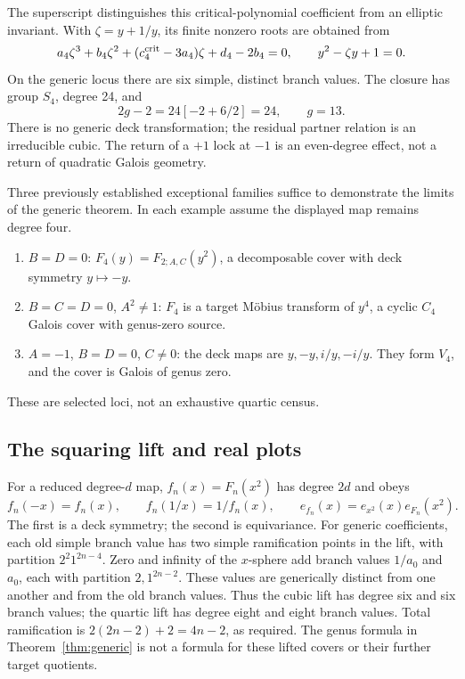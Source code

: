 The superscript distinguishes this critical-polynomial coefficient from an elliptic invariant. With \(\zeta=y+1/y\), its finite nonzero roots are obtained from
\begin{equation}\label{eq:critical_cubic4}
 a_4\zeta^3+b_4\zeta^2+(c_4^{\rm crit}-3a_4)\zeta+d_4-2b_4=0,
 \qquad y^2-\zeta y+1=0.
\end{equation}
On the generic locus there are six simple, distinct branch values. The closure has group \(S_4\), degree 24, and
\begin{equation}\label{eq:quartic_genus}
 2g-2=24[-2+6/2]=24,\qquad g=13.
\end{equation}
There is no generic deck transformation; the residual partner relation is an irreducible cubic. The return of a \(+1\) lock at \(-1\) is an even-degree effect, not a return of quadratic Galois geometry.

Three previously established exceptional families suffice to demonstrate the limits of the generic theorem. In each example assume the displayed map remains degree four.
\begin{enumerate}
\item \(B=D=0\): \(F_4(y)=F_{2;A,C}(y^2)\), a decomposable cover with deck symmetry \(y\mapsto-y\).
\item \(B=C=D=0\), \(A^2\ne1\): \(F_4\) is a target Möbius transform of \(y^4\), a cyclic \(C_4\) Galois cover with genus-zero source.
\item \(A=-1\), \(B=D=0\), \(C\ne0\): the deck maps are \(y,-y,i/y,-i/y\). They form \(V_4\), and the cover is Galois of genus zero.
\end{enumerate}
These are selected loci, not an exhaustive quartic census.

\subsection{The squaring lift and real plots}\label{sec:x_lift}
For a reduced degree-\(d\) map, \(f_n(x)=F_n(x^2)\) has degree \(2d\) and obeys
\begin{equation}\label{eq:x_lift}
 f_n(-x)=f_n(x),\qquad f_n(1/x)=1/f_n(x),\qquad
 e_{f_n}(x)=e_{x^2}(x)e_{F_n}(x^2).
\end{equation}
The first is a deck symmetry; the second is equivariance. For generic coefficients, each old simple branch value has two simple ramification points in the lift, with partition \(2^2 1^{2n-4}\). Zero and infinity of the \(x\)-sphere add branch values \(1/a_0\) and \(a_0\), each with partition \(2,1^{2n-2}\). These values are generically distinct from one another and from the old branch values. Thus the cubic lift has degree six and six branch values; the quartic lift has degree eight and eight branch values. Total ramification is \(2(2n-2)+2=4n-2\), as required. The genus formula in Theorem~\ref{thm:generic} is not a formula for these lifted covers or their further target quotients.

